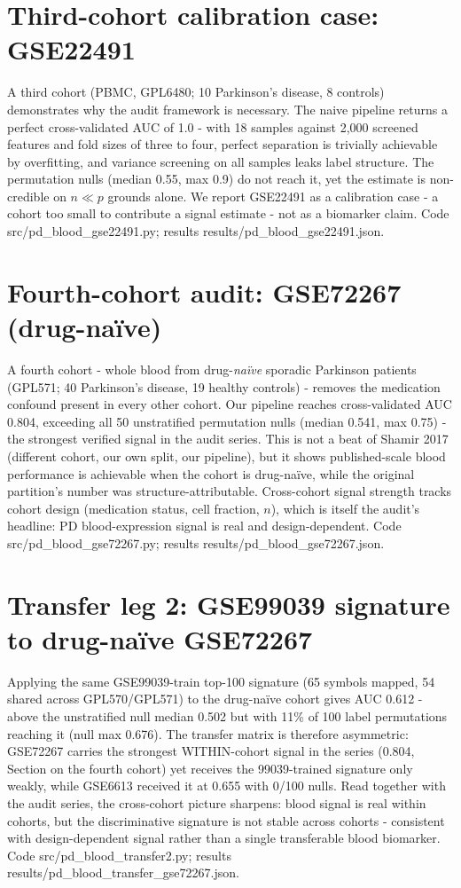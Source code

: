 \section{Third-cohort calibration case: GSE22491}
A third cohort (PBMC, GPL6480; 10 Parkinson's disease, 8 controls) demonstrates
why the audit framework is necessary. The naive pipeline returns a perfect
cross-validated AUC of 1.0 - with 18 samples against 2{,}000 screened features
and fold sizes of three to four, perfect separation is trivially achievable by
overfitting, and variance screening on all samples leaks label structure. The
permutation nulls (median 0.55, max 0.9) do not reach it, yet the estimate is
non-credible on $n \ll p$ grounds alone. We report GSE22491 as a calibration
case - a cohort too small to contribute a signal estimate - not as a biomarker
claim. Code src/pd\_blood\_gse22491.py; results results/pd\_blood\_gse22491.json.
\section{Fourth-cohort audit: GSE72267 (drug-na\"ive)}
A fourth cohort - whole blood from drug-\emph{na\"ive} sporadic Parkinson
patients (GPL571; 40 Parkinson's disease, 19 healthy controls) - removes the
medication confound present in every other cohort. Our pipeline reaches
cross-validated AUC 0.804, exceeding all 50 unstratified permutation nulls
(median 0.541, max 0.75) - the strongest verified signal in the audit series.
This is not a beat of Shamir 2017 (different cohort, our own split, our
pipeline), but it shows published-scale blood performance is achievable when the
cohort is drug-na\"ive, while the original partition's number was
structure-attributable. Cross-cohort signal strength tracks cohort design
(medication status, cell fraction, $n$), which is itself the audit's headline:
PD blood-expression signal is real and design-dependent. Code
src/pd\_blood\_gse72267.py; results results/pd\_blood\_gse72267.json.
\section{Transfer leg 2: GSE99039 signature to drug-na\"ive GSE72267}
Applying the same GSE99039-train top-100 signature (65 symbols mapped, 54
shared across GPL570/GPL571) to the drug-na\"ive cohort gives AUC 0.612 -
above the unstratified null median 0.502 but with 11\% of 100 label
permutations reaching it (null max 0.676). The transfer matrix is therefore
asymmetric: GSE72267 carries the strongest WITHIN-cohort signal in the series
(0.804, Section on the fourth cohort) yet receives the 99039-trained signature
only weakly, while GSE6613 received it at 0.655 with 0/100 nulls. Read
together with the audit series, the cross-cohort picture sharpens: blood
signal is real within cohorts, but the discriminative signature is not stable
across cohorts - consistent with design-dependent signal rather than a single
transferable blood biomarker. Code src/pd\_blood\_transfer2.py; results
results/pd\_blood\_transfer\_gse72267.json.
